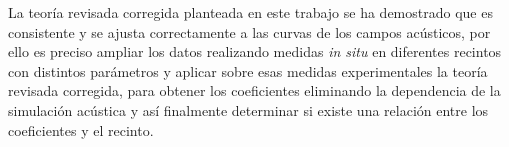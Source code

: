 La teoría revisada corregida planteada en este trabajo se ha demostrado que es consistente y se ajusta correctamente a las curvas de los campos acústicos, por ello es preciso ampliar los datos realizando medidas \textit{in situ} en diferentes recintos con distintos parámetros y aplicar sobre esas medidas experimentales la teoría revisada corregida, para obtener los coeficientes eliminando la dependencia de la simulación acústica y así finalmente determinar si existe una relación entre los coeficientes y el recinto.






















